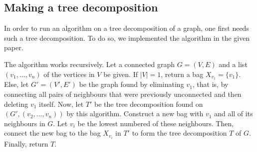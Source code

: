 \subsection{Making a tree decomposition} \label{sec:treewidth1}
In order to run an algorithm on a tree decomposition of a graph, one first needs such a tree decomposition. To do so, we implemented the algorithm in the given paper.

The algorithm works recursively. Let a connected graph $G = (V,E)$ and a list $(v_1, ... , v_n)$ of the vertices in $V$ be given. If $|V| = 1$, return a bag $X_{v_1} = \{v_1\}$. Else, let $G' = (V',E')$ be the graph found by eliminating $v_1$, that is, by connecting all pairs of neighbours that were previously unconnected and then deleting $v_1$ itself. Now, let $T'$ be the tree decomposition found on $(G',(v_2,...,v_n))$ by this algorithm. Construct a new bag with $v_1$ and all of its neighbours in $G$. Let $v_i$ be the lowest numbered of these neighbours. Then, connect the new bag to the bag $X_{v_i}$ in $T'$ to form the tree decomposition $T$ of $G$. Finally, return $T$.

